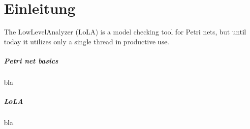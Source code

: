\chapter{Einleitung}
\label{introduction}

The LowLevelAnalyzer (LoLA) is a model checking tool for Petri nets, but until today it utilizes only a single thread in productive use.

\paragraph*{Petri net basics}
bla
\paragraph*{LoLA}
bla